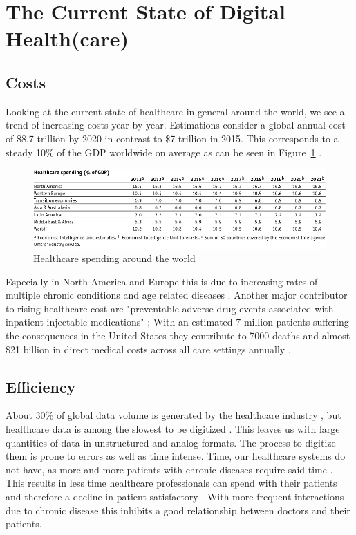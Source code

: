 \section{The Current State of Digital Health(care)}
\subsection{Costs}
Looking at the current state of healthcare in general around the world, we see a trend of increasing costs year by year. Estimations consider a global annual cost of \$8.7 trillion by 2020 in contrast to \$7 trillion in 2015. This corresponds to a steady 10\% of the GDP worldwide on average as can be seen in Figure~\ref{fig:GDPSpendingHC} \cite{EIU2016}.
\begin{figure}[htpb]
    \centering
    \includegraphics[width=\linewidth]{media/Screenshot_2020-01-09_01_FULL_REPORT-World_healthcare_and.png}
    \caption{Healthcare spending around the world}%
    \label{fig:GDPSpendingHC}
\end{figure}
Especially in North America and Europe this is due to increasing rates of multiple chronic conditions and age related diseases \cite{sambamoorthi2015multiple}. Another major contributor to rising healthcare cost are "preventable adverse drug events associated with inpatient injectable medications" \cite{lahue2012national}; With an estimated 7 million patients suffering the consequences in the United States they contribute to 7000 deaths and almost \$21 billion in direct medical costs across all care settings annually \cite{prevMedErrors}.
\subsection{Efficiency}
About 30\% of global data volume is generated by the healthcare industry \cite{gopal2019digital}, but healthcare data is among the slowest to be digitized \cite{industryDigitalization}. This leaves us with large quantities of data in unstructured and analog formats. The process to digitize them is prone to errors as well as time intense. Time, our healthcare systems do not have, as more and more patients with chronic diseases require said time \cite{ostbye2005there}. This results in less time healthcare professionals can spend with their patients \cite{fuchtbauer2013emergency} and therefore a decline in patient satisfactory \cite{gross1998patient}. With more frequent interactions due to chronic disease this inhibits a good relationship between doctors and their patients.
